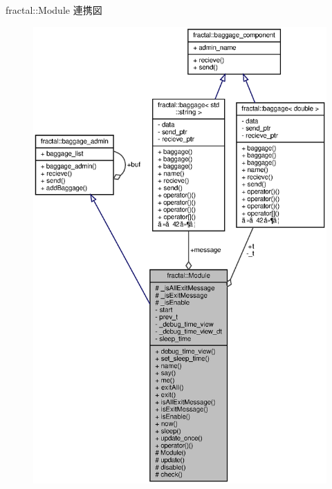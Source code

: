 fractal\+:\+:Module 連携図
\nopagebreak
\begin{figure}[H]
\begin{center}
\leavevmode
\includegraphics[width=350pt]{classfractal_1_1Module__coll__graph}
\end{center}
\end{figure}
